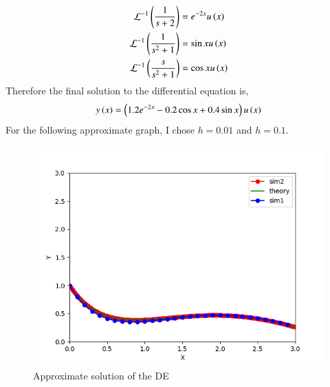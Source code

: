 \documentclass[journal]{IEEEtran}
\begin{document}
    \\
\begin{align}
    \mathcal{L}^{-1}\left(\frac{1}{s+2}\right) &= e^{-2x}u\left(x\right)\\
    \mathcal{L}^{-1}\left(\frac{1}{s^2+1}\right) &= \sin xu\left(x\right)\\
    \mathcal{L}^{-1}\left(\frac{s}{s^2+1}\right) &= \cos xu\left(x\right)
\end{align}
Therefore the final solution to the differential equation is,
\begin{align}
    y\left(x\right) = \left(1.2e^{-2x} - 0.2\cos x + 0.4\sin x\right)u\left(x\right) 
\end{align}
For the following approximate graph, I chose $h = 0.01$ and $h = 0.1$.
\begin{figure}[h!]
   \centering
   \includegraphics[width=0.7\columnwidth]{figs/fig.png}
    \caption{Approximate solution of the DE}
\end{figure}
\end{document}
